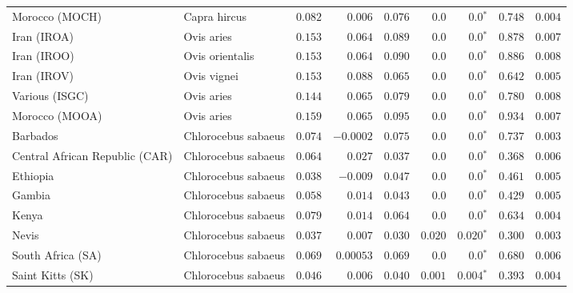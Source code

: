 \begin{center}
\begin{adjustbox}{width = 1\textwidth}
\begin{tabular}{|l|l|r|r|r|r|r|r|r|}
            Morocco (MOCH)                    & Capra hircus     & $ 0.082$ & $ 0.006$  & $ 0.076$ & $0.0$    & $\bm{0.0{^*}}$    & $ 0.748$ & $ 0.004$ \\
            Iran (IROA)                    & Ovis aries         & $ 0.153$ & $ 0.064$  & $ 0.089$ & $0.0$    & $\bm{0.0{^*}}$    & $ 0.878$ & $ 0.007$ \\
            Iran (IROO)                 & Ovis orientalis          & $ 0.153$ & $ 0.064$  & $ 0.090$ & $0.0$    & $\bm{0.0{^*}}$    & $ 0.886$ & $ 0.008$ \\
            Iran (IROV)                 & Ovis vignei          & $ 0.153$ & $ 0.088$  & $ 0.065$ & $0.0$    & $\bm{0.0{^*}}$    & $ 0.642$ & $ 0.005$ \\
            Various (ISGC)                       & Ovis aries & $ 0.144$ & $ 0.065$ & $ 0.079$ & $0.0$    & $\bm{0.0{^*}}$    & $ 0.780$ & $ 0.008$ \\
            Morocco (MOOA) & Ovis aries & $ 0.159$ & $ 0.065$  & $ 0.095$ & $0.0$ & $\bm{0.0{^*}}$ & $ 0.934$ & $ 0.007$ \\
            Barbados                       & Chlorocebus sabaeus & $ 0.074$ & $-0.0002$  & $ 0.075$ & $0.0$    & $\bm{0.0{^*}}$    & $ 0.737$ & $ 0.003$ \\
            Central African Republic (CAR)                         & Chlorocebus sabaeus & $ 0.064$ & $ 0.027$  & $ 0.037$ & $0.0$    & $\bm{0.0{^*}}$    & $ 0.368$ & $ 0.006$ \\
            Ethiopia                          & Chlorocebus sabaeus & $ 0.038$ & $-0.009$  & $ 0.047$ & $0.0$    & $\bm{0.0{^*}}$    & $ 0.461$ & $ 0.005$ \\
            Gambia                          & Chlorocebus sabaeus & $ 0.058$ & $ 0.014$  & $ 0.043$ & $0.0$ & $\bm{0.0{^*}}$ & $ 0.429$ & $ 0.005$ \\
            Kenya              & Chlorocebus sabaeus & $ 0.079$ & $ 0.014$ & $ 0.064$ & $0.0$    & $\bm{0.0{^*}}$ & $ 0.634$ & $ 0.004$ \\
            Nevis               & Chlorocebus sabaeus & $ 0.037$ & $ 0.007$  & $ 0.030$ & $ 0.020$ & $\bm{ 0.020{^*}}$ & $ 0.300$ & $ 0.003$ \\
            South Africa (SA)                         & Chlorocebus sabaeus & $ 0.069$ & $0.00053$  & $ 0.069$ & $0.0$    & $\bm{0.0{^*}}$    & $ 0.680$ & $ 0.006$ \\
            Saint Kitts (SK)                  & Chlorocebus sabaeus        & $ 0.046$ & $ 0.006$  & $ 0.040$ & $ 0.001$    & $\bm{ 0.004{^*}}$    & $ 0.393$ & $ 0.004$ \\

\end{tabular}
\end{adjustbox}
\end{center}
